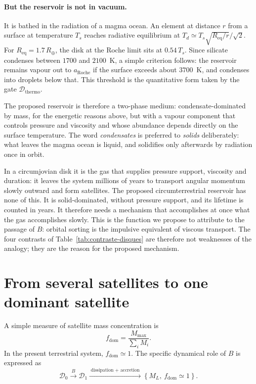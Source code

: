 \documentclass[11pt,a4paper,openany]{report}
\newcommand{\Rt}{R_{\oplus}}
\newcommand{\Req}{R_{\mathrm{eq}}}
\newcommand{\aR}{a_{\mathrm{Roche}}}
\begin{document}
\paragraph{But the reservoir is not in vacuum.} It is bathed in the radiation of a magma ocean. An
element at distance $r$ from a surface at temperature $T_s$ reaches radiative equilibrium at
$T_d\simeq T_s\sqrt{\Req/r}/\sqrt2$. For $\Req=1.7\,\Rt$, the disk at the Roche limit sits at
$0.54\,T_s$. Since silicate condenses between $1700$ and $2100$~K, a simple criterion follows: the
reservoir remains vapour out to $\aR$ if the surface exceeds about $3700$~K, and condenses into
droplets below that. This threshold is the quantitative form taken by the gate
$\mathcal{D}_{\mathrm{thermo}}$.

The proposed reservoir is therefore a two-phase medium: condensate-dominated by mass, for the
energetic reasons above, but with a vapour component that controls pressure and viscosity and whose
abundance depends directly on the surface temperature. The word \emph{condensates} is preferred to
\emph{solids} deliberately: what leaves the magma ocean is liquid, and solidifies only afterwards by
radiation once in orbit.

\begin{ideephys}
In a circumjovian disk it is the gas that supplies pressure support, viscosity and duration: it
leaves the system millions of years to transport angular momentum slowly outward and form
satellites. The proposed circumterrestrial reservoir has none of this. It is solid-dominated,
without pressure support, and its lifetime is counted in years. It therefore needs a mechanism that
accomplishes at once what the gas accomplishes slowly. This is the function we propose to attribute
to the passage of $B$: orbital sorting is the impulsive equivalent of viscous transport. The four
contrasts of Table~\ref{tab:contraste-disques} are therefore not weaknesses of the analogy; they are
the reason for the proposed mechanism.
\end{ideephys}

\section{From several satellites to one dominant satellite}

A simple measure of satellite mass concentration is
\begin{equation}
f_{\mathrm{dom}}=\frac{M_{\max}}{\sum_i M_i}.
\label{eq:fdom}
\end{equation}
In the present terrestrial system, $f_{\mathrm{dom}}\simeq1$. The specific dynamical role of $B$ is
expressed as
\begin{equation}
\mathcal{D}_0\xrightarrow{\;B\;}\mathcal{D}_1
\xrightarrow{\;\text{dissipation + accretion}\;}\left\{M_L,\ f_{\mathrm{dom}}\simeq1\right\}.
\label{eq:roleB}
\end{equation}
\end{document}
